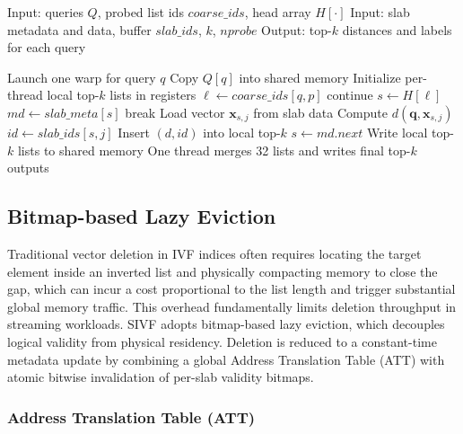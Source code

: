 \documentclass[sigconf,anonymous]{acmart}
\theoremstyle{plain}
\theoremstyle{definition}
\theoremstyle{remark}
\begin{document}
\begin{algorithm}[t]
\caption{Warp-cooperative search in SIVF}
\label{alg:sivf_search}
\begin{algorithmic}[1]
\State Input: queries $Q$, probed list ids $coarse\_ids$, head array $H[\cdot]$
\State Input: slab metadata and data, buffer $slab\_ids$, $k$, $nprobe$
\State Output: top-$k$ distances and labels for each query

    \State Launch one warp for query $q$
    \State Copy $Q[q]$ into shared memory
    \State Initialize per-thread local top-$k$ lists in registers
        \State $\ell \gets coarse\_ids[q,p]$
         \State continue \EndIf
        \State $s \gets H[\ell]$
            \State $md \gets slab\_meta[s]$
             \State break \EndIf
                \State Load vector $\mathbf{x}_{s,j}$ from slab data
                \State Compute $d(\mathbf{q}, \mathbf{x}_{s,j})$
                \State $id \gets slab\_ids[s,j]$
                \State Insert $(d,id)$ into local top-$k$
            \EndIf
            \State $s \gets md.next$
        \EndWhile
    \EndFor
    \State Write local top-$k$ lists to shared memory
    \State One thread merges 32 lists and writes final top-$k$ outputs
\EndFor
\end{algorithmic}
\end{algorithm}

\subsection{Bitmap-based Lazy Eviction}
\label{sec:bitmap_lazy_eviction}

Traditional vector deletion in IVF indices often requires locating the target element inside an inverted list and physically compacting memory to close the gap, which can incur a cost proportional to the list length and trigger substantial global memory traffic. This overhead fundamentally limits deletion throughput in streaming workloads. SIVF adopts bitmap-based lazy eviction, which decouples logical validity from physical residency. Deletion is reduced to a constant-time metadata update by combining a global Address Translation Table (ATT) with atomic bitwise invalidation of per-slab validity bitmaps.

\subsubsection{Address Translation Table (ATT)}
\end{document}
